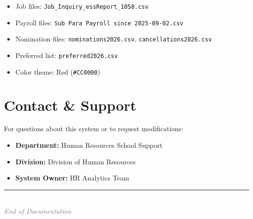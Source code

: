 \documentclass[12pt,letterpaper]{article}
\begin{document}
\begin{itemize}[leftmargin=*]
    \item Job files: \texttt{Job\_Inquiry\_essReport\_1058.csv}
    \item Payroll files: \texttt{Sub Para Payroll since 2025-09-02.csv}
    \item Nomination files: \texttt{nominations2026.csv}, \texttt{cancellations2026.csv}
    \item Preferred list: \texttt{preferred2026.csv}
    \item Color theme: Red (\texttt{\#CC0000})
\end{itemize}

\section{Contact \& Support}

For questions about this system or to request modifications:

\begin{itemize}[leftmargin=*]
    \item \textbf{Department:} Human Resources School Support
    \item \textbf{Division:} Division of Human Resources
    \item \textbf{System Owner:} HR Analytics Team
\end{itemize}

\vspace{1cm}
\begin{center}
\textcolor{graytext}{\rule{0.5\textwidth}{0.5pt}}\\
\vspace{0.5cm}
\textit{\textcolor{graytext}{End of Documentation}}
\end{center}
\end{document}
